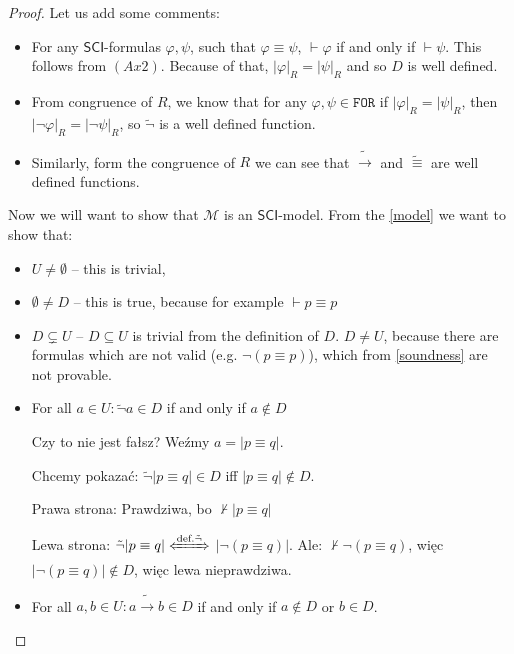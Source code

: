 \documentclass{article}
\theoremstyle{definition}
\theoremstyle{definition}
\newcommand*{\id}{\equiv}
\newcommand*{\ra}{\rightarrow}
\newcommand*{\FOR}{\texttt{FOR}}
\newcommand{\SCI}{$\mathsf{SCI}$\xspace}
\begin{document}
\begin{proof}
    Let us add some comments:
    \begin{itemize}
        \item For any \SCI-formulas $\varphi, \psi$, such that $\varphi \id \psi$, $\vdash
                  \varphi$ if and only if $\vdash \psi$. This follows from $(Ax2)$. Because of
              that, $|\varphi|_R = |\psi|_R$ and so $D$ is well defined.
        \item From congruence of $R$, we know that for any $\varphi, \psi \in \FOR$ if
              $|\varphi|_R = |\psi|_R$, then $|\lnot \varphi|_R = |\lnot \psi|_R$, so
              $\tilde{\lnot}$ is a well defined function.
        \item Similarly, form the congruence of $R$ we can see that $\tilde{\ra}$ and
              $\tilde{\id}$ are well defined functions.
    \end{itemize}

    Now we will want to show that $\mathcal{M}$ is an \SCI-model. From the
    \cref{model} we want to show that:
    \begin{itemize}
        \item $U \not = \emptyset$ -- this is trivial,
        \item $\emptyset \not = D$ -- this is true, because for example $\vdash p \id p$
        \item $D \subsetneq U$ --  $D \subseteq U$ is trivial from the definition of $D$. $D \not = U$, because there are formulas which are not valid (e.g. $\lnot(p \id p)$), which from \cref{soundness} are not provable.
        \item For all $a \in U: \tilde{\lnot} a \in D$ if and only if $a \not \in D$

              {\color{red} Czy to nie jest fałsz? Weźmy $a=|p\id q|$.

                      Chcemy pokazać: $\tilde{\lnot}|p \id q| \in D$ iff $|p \id q| \not \in D$.

                      Prawa strona: Prawdziwa, bo $\not \vdash |p \id q|$

                      Lewa strona: $\tilde{\lnot}|p \id q| \xLeftrightarrow{\text{def.}
                              \tilde{\lnot}}$ $|\lnot(p \id q)|$. Ale: $\not \vdash \lnot(p \id q)$, więc
                      $|\lnot(p \id q)| \not \in D$, więc lewa nieprawdziwa.}
        \item For all $a, b \in U: a \tilde{\ra}b \in D$ if and only if $a \not \in D$ or $b
                  \in D$.


\end{itemize}
\end{proof}
\end{document}
